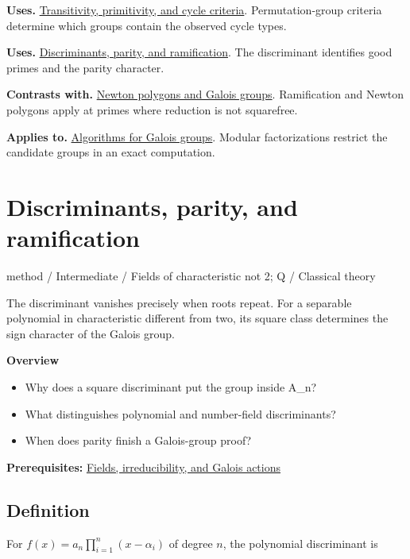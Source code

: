 \documentclass[11pt,a4paper,oneside,openany]{book}
\begin{document}
\color{black}\textbf{Uses.} \hyperlink{article:permutation-groups}{Transitivity, primitivity, and cycle criteria}. Permutation-group criteria determine which groups contain the observed cycle types.\par
\color{black}\textbf{Uses.} \hyperlink{article:discriminants}{Discriminants, parity, and ramification}. The discriminant identifies good primes and the parity character.\par
\color{black}\textbf{Contrasts with.} \hyperlink{article:newton-polygons}{Newton polygons and Galois groups}. Ramification and Newton polygons apply at primes where reduction is not squarefree.\par
\color{black}\textbf{Applies to.} \hyperlink{article:galois-computation}{Algorithms for Galois groups}. Modular factorizations restrict the candidate groups in an exact computation.\par
\endgroup
\chapter{Discriminants, parity, and ramification}\label{article:discriminants}\hypertarget{article:discriminants}{}\color{black}
{\sffamily\small\color{atlasgold}method / Intermediate / Fields of characteristic not 2; Q / Classical theory}\par\medskip
The discriminant vanishes precisely when roots repeat. For a separable polynomial in characteristic different from two, its square class determines the sign character of the Galois group.\par\medskip
\textbf{Overview}\begin{itemize}
\item Why does a square discriminant put the group inside A\_\allowbreak{}n?
\item What distinguishes polynomial and number-field discriminants?
\item When does parity finish a Galois-group proof?
\end{itemize}
{\small\textbf{Prerequisites:} \hyperlink{article:foundations}{Fields, irreducibility, and Galois actions}}\par
{}\section{Definition}
\color{black} For \(f(x)=a_n\prod_{i=1}^n(x-\alpha_i)\) of degree \(n\), the polynomial discriminant is\par
\end{document}
